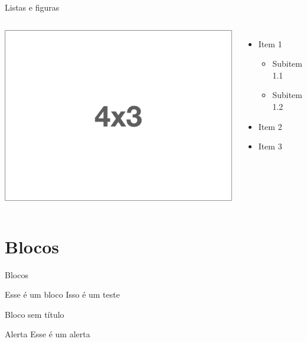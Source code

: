 \documentclass[aspectratio=169]{beamer}
\begin{document}
\begin{frame}{Listas e figuras}
\begin{columns}
     \begin{center}
        \includegraphics[width=\linewidth]{figs/4x3.png}
     \end{center}
    \begin{itemize}
        \item Item 1
        \begin{itemize}
            \item Subitem 1.1
            \item Subitem 1.2
        \end{itemize}
        \item Item 2
        \item Item 3
    \end{itemize}
\end{columns} 
\end{frame}


\section{Blocos}


\begin{frame}{Blocos}
    \begin{block}{Esse é um bloco}
        Isso é um teste
    \end{block}
    \begin{block}{}
    Bloco sem título	
    \end{block}
    \begin{alertblock}{Alerta}
        Esse é um alerta
    \end{alertblock}
\end{frame}
\end{document}
